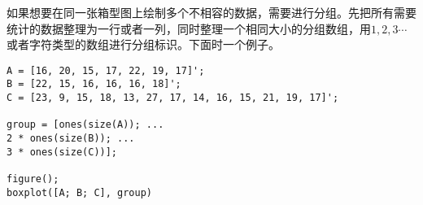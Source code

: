 如果想要在同一张箱型图上绘制多个不相容的数据，需要进行分组。先把所有需要统计的数据整理为一行或者一列，同时整理一个相同大小的分组数组，用$ 1, 2, 3 \cdots $或者字符类型的数组进行分组标识。下面时一个例子。

\begin{verbatim}
A = [16, 20, 15, 17, 22, 19, 17]';
B = [22, 15, 16, 16, 16, 18]';
C = [23, 9, 15, 18, 13, 27, 17, 14, 16, 15, 21, 19, 17]';

group = [ones(size(A)); ...
2 * ones(size(B)); ...
3 * ones(size(C))];

figure();
boxplot([A; B; C], group)
\end{verbatim}



